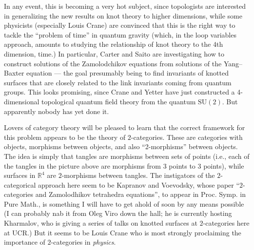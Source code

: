\documentclass{article}
\def\tightlist{}
\renewcommand{\texttt}[1]{%
  \begingroup
  \ttfamily
  \begingroup\lccode`~=`/\lowercase{\endgroup\def~}{/\discretionary{}{}{}}%
  \begingroup\lccode`~=`[\lowercase{\endgroup\def~}{[\discretionary{}{}{}}%
  \begingroup\lccode`~=`.\lowercase{\endgroup\def~}{.\discretionary{}{}{}}%
  \catcode`/=\active\catcode`[=\active\catcode`.=\active
  \scantokens{#1\noexpand}%
  \endgroup
}
\begin{document}
In any event, this is becoming a very hot subject, since topologists are
interested in generalizing the new results on knot theory to higher
dimensions, while some physicists (especially Louis Crane) are convinced
that this is the right way to tackle the ``problem of time'' in quantum
gravity (which, in the loop variables approach, amounts to studying the
relationship of knot theory to the 4th dimension, time.) In particular,
Carter and Saito are investigating how to construct solutions of the
Zamolodchikov equations from solutions of the Yang--Baxter equation ---
the goal presumably being to find invariants of knotted surfaces that
are closely related to the link invariants coming from quantum groups.
This looks promising, since Crane and Yetter have just constructed a
4-dimensional topological quantum field theory from the quantum
\(\mathrm{SU}(2)\). But apparently nobody has yet done it.

Lovers of category theory will be pleased to learn that the correct
framework for this problem appears to be the theory of \(2\)-categories.
These are categories with objects, morphisms between objects, and also
``2-morphisms'' between objects. The idea is simply that tangles are
morphisms between sets of points (i.e., each of the tangles in the
picture above are morphisms from 3 points to 3 points), while surfaces
in \(\mathbb{R}^4\) are \(2\)-morphisms between tangles. The instigators
of the \(2\)-categorical approach here seem to be Kapranov and
Voevodsky, whose paper ``\(2\)-categories and Zamolodhikov tetrahedra
equations'', to appear in Proc. Symp. in Pure Math., is something I will
have to get ahold of soon by any means possible (I can probably nab it
from Oleg Viro down the hall; he is currently hosting Kharmalov, who is
giving a series of talks on knotted surfaces at \(2\)-categories here at
UCR.) But it seems to be Louis Crane who is most strongly proclaiming
the importance of \(2\)-categories in \emph{physics}.

\end{document}
